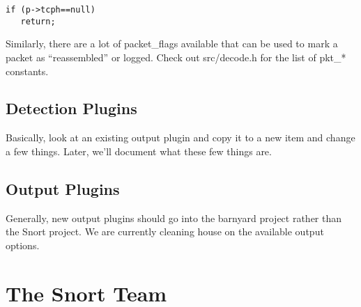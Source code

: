 \documentclass[english]{report}
\begin{document}
\begin{verbatim}
if (p->tcph==null)
   return;
\end{verbatim}
Similarly, there are a lot of packet\_flags available that can be
used to mark a packet as ``reassembled'' or logged. Check out src/decode.h
for the list of pkt\_{*} constants.

\subsection{Detection Plugins}
Basically, look at an existing output plugin and copy it to a new item
and change a few things. Later, we'll document what these few things are.

\subsection{Output Plugins}
Generally, new output plugins should go into the barnyard project
rather than the Snort project. We are currently cleaning house on the
available output options.

\section{The Snort Team}
\end{document}
